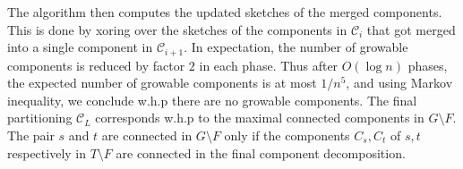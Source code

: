 %

The algorithm then computes the updated sketches of the merged components. This is done by xoring over the sketches of the components in $\mathcal{C}_i$ that got merged into a single component in 
$\mathcal{C}_{i+1}$. In expectation, the number of growable components is reduced by factor $2$ in each phase. Thus after $O(\log n)$ phases, the expected number of growable components is at most $1/n^5$, and using Markov inequality, we conclude w.h.p there are no growable components. The final partitioning $\mathcal{C}_L$ corresponds w.h.p to the maximal connected components in $G \setminus F$. The pair $s$ and $t$ are connected in $G \setminus F$ only if the components $C_s,C_t$ of $s,t$ respectively in $T \setminus F$ are connected in the final component decomposition.


